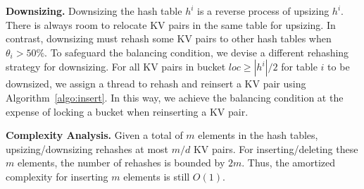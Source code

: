 \vspace{1mm}\noindent\textbf{Downsizing.}
Downsizing the hash table $h^i$ is a reverse process of upsizing $h^i$. There is always room to relocate KV pairs in the same table for upsizing. 
In contrast, downsizing must rehash some KV pairs to other hash tables when $\theta_i > 50\%$.
To safeguard the balancing condition, we devise a different rehashing strategy for downsizing. 
For all KV pairs in bucket $loc \geq |h^i|/2$ for table $i$ to be downsized, we assign a thread to rehash and reinsert a KV pair using Algorithm~\ref{algo:insert}. 
In this way, we achieve the balancing condition at the expense of locking a bucket when reinserting a KV pair. 

\vspace{1mm}\noindent\textbf{Complexity Analysis.}
Given a total of $m$ elements in the hash tables, upsizing/downsizing rehashes at most $m/d$ KV pairs. 
For inserting/deleting these $m$ elements, the number of rehashes is bounded by $2m$. 
Thus, the amortized complexity for inserting $m$ elements is still $O(1)$.
